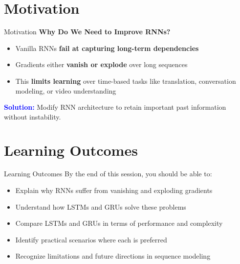 \section{Motivation}
\begin{frame}{Motivation}
    \textbf{Why Do We Need to Improve RNNs?}

    \begin{itemize}
        \setlength{\itemsep}{1em}
        \item Vanilla RNNs \textbf{fail at capturing long-term dependencies}
        \item Gradients either \textbf{vanish or explode} over long sequences
        \item This \textbf{limits learning} over time-based tasks like translation, conversation modeling, or video understanding
    \end{itemize}

    \textbf{\textcolor{blue}{Solution:}} Modify RNN architecture to retain important past information without instability.
\end{frame}

\section{Learning Outcomes}
\begin{frame}{Learning Outcomes}
    By the end of this session, you should be able to:
    \begin{itemize}
        \setlength{\itemsep}{1em}
        \item Explain why RNNs suffer from vanishing and exploding gradients
        \item Understand how LSTMs and GRUs solve these problems
        \item Compare LSTMs and GRUs in terms of performance and complexity
        \item Identify practical scenarios where each is preferred
        \item Recognize limitations and future directions in sequence modeling
    \end{itemize}
\end{frame}


